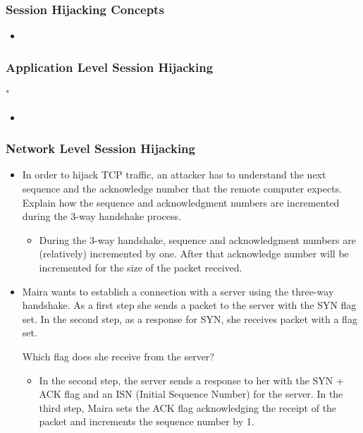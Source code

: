 \subsubsection{Session Hijacking Concepts}
\begin{itemize}
    \item 
\end{itemize}
\subsubsection{Application Level Session Hijacking}"
\begin{itemize}
    \item
\end{itemize}
\subsubsection{Network Level Session Hijacking}
\begin{itemize}
    \item In order to hijack TCP traffic, an attacker has to understand the next sequence and the acknowledge number that the remote computer expects. Explain how the sequence and acknowledgment numbers are incremented during the 3-way handshake process.
    \begin{itemize}
        \item During the 3-way handshake, sequence and acknowledgment numbers are (relatively) incremented by one. After that acknowledge number will be incremented for the size of the packet received.
    \end{itemize}
    \item Maira wants to establish a connection with a server using the three-way handshake. As a first step she sends a packet to the server with the SYN flag set. In the second step, as a response for SYN, she receives packet with a flag set.

    Which flag does she receive from the server?
    \begin{itemize}
        \item In the second step, the server sends a response to her with the SYN + ACK flag and an ISN (Initial Sequence Number) for the server.
        In the third step, Maira sets the ACK flag acknowledging the receipt of the packet and increments the sequence number by 1.
    \end{itemize}
\end{itemize}
